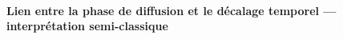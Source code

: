 \paragraph{Lien entre la phase de diffusion et le décalage temporel — interprétation semi-classique}
%
%
%

